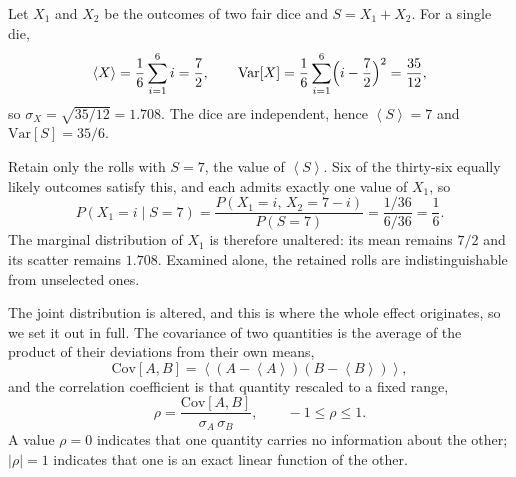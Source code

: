 \documentclass[12pt]{article}
\newcommand{\avg}[1]{\left\langle #1 \right\rangle}
\newcommand{\Var}{\mathrm{Var}}
\newcommand{\Cov}{\mathrm{Cov}}
\begin{document}
Let $X_1$ and $X_2$ be the outcomes of two fair dice and $S = X_1 + X_2$.  For
a single die,
\begin{equation}
  \avg{X} = \frac{1}{6}\sum_{i=1}^{6} i = \frac{7}{2}, \qquad
  \Var[X]  = \frac{1}{6}\sum_{i=1}^{6}\Bigl(i - \frac{7}{2}\Bigr)^{2}
           = \frac{35}{12},
  \label{eq:die}
\end{equation}
so $\sigma_X = \sqrt{35/12} = 1.708$.  The dice are independent, hence
$\avg{S} = 7$ and $\Var[S] = 35/6$.

Retain only the rolls with $S = 7$, the value of $\avg{S}$.  Six of the
thirty-six equally likely outcomes satisfy this, and each admits exactly one
value of $X_1$, so
\begin{equation}
  P(X_1 = i \mid S = 7)
    = \frac{P(X_1 = i,\, X_2 = 7-i)}{P(S = 7)}
    = \frac{1/36}{6/36} = \frac{1}{6}.
\end{equation}
The marginal distribution of $X_1$ is therefore unaltered: its mean remains
$7/2$ and its scatter remains $1.708$.  Examined alone, the retained rolls are
indistinguishable from unselected ones.

The joint distribution is altered, and this is where the whole effect
originates, so we set it out in full.  The covariance of two quantities is the
average of the product of their deviations from their own means,
\begin{equation}
  \Cov[A, B] = \avg{(A - \avg{A})(B - \avg{B})},
  \label{eq:cov}
\end{equation}
and the correlation coefficient is that quantity rescaled to a fixed range,
\begin{equation}
  \rho = \frac{\Cov[A, B]}{\sigma_A\,\sigma_B}, \qquad -1 \leq \rho \leq 1 .
  \label{eq:rho}
\end{equation}
A value $\rho = 0$ indicates that one quantity carries no information about the
other; $|\rho| = 1$ indicates that one is an exact linear function of the other.
\end{document}
